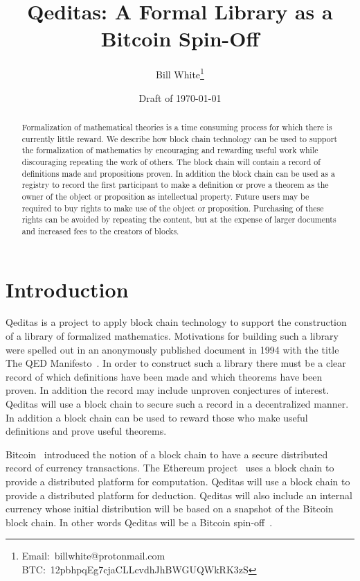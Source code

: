 \documentclass{article}
\title{Qeditas: A Formal Library as a Bitcoin Spin-Off}
\author{Bill White\footnote{\mbox{Email:~billwhite@protonmail.com} \mbox{BTC: 12pbhpqEg7cjaCLLcvdhJhBWGUQWkRK3zS}}}
\date{{Draft of \today}}
\begin{document}
\maketitle

\begin{abstract}
Formalization of mathematical theories is a time consuming process
for which there is currently little reward. We describe how block chain
technology can be used to support the formalization of mathematics by
encouraging and rewarding useful work while discouraging repeating the
work of others. The block chain will contain a record of definitions made
and propositions proven. In addition the block chain can be used as a
registry to record the first participant to make a definition or prove a
theorem as the owner of the object or proposition as intellectual property.
Future users may be required to buy rights to make use of the object or
proposition. Purchasing of these rights can be avoided by repeating the
content, but at the expense of larger documents and increased fees to the
creators of blocks.
\end{abstract}

\section{Introduction}

Qeditas
is a project to apply block chain technology to
support the construction of a library of formalized mathematics.
Motivations for building such a library
were spelled out in an anonymously published document in
1994 with the title The QED Manifesto~\cite{QED}.
In order to construct such a library there must be
a clear record of which definitions have been made
and which theorems have been proven.
In addition the record may include unproven conjectures
of interest.
Qeditas will use a block chain to secure such a record in a decentralized manner.
In addition a block chain can be used to reward those who
make useful definitions and prove useful theorems.

Bitcoin~\cite{Nakamoto2008} introduced the notion of a block chain
to have a secure distributed record of currency transactions.
The Ethereum project~\cite{WoodEtheriumYellow} uses a block chain
to provide a distributed platform for computation.
Qeditas will use a block chain to provide a distributed platform for deduction.
Qeditas will also include an internal currency whose initial
distribution will be based on a snapshot of the Bitcoin block chain.
In other words Qeditas will be a Bitcoin spin-off~\cite{Spinoff}.
\end{document}
